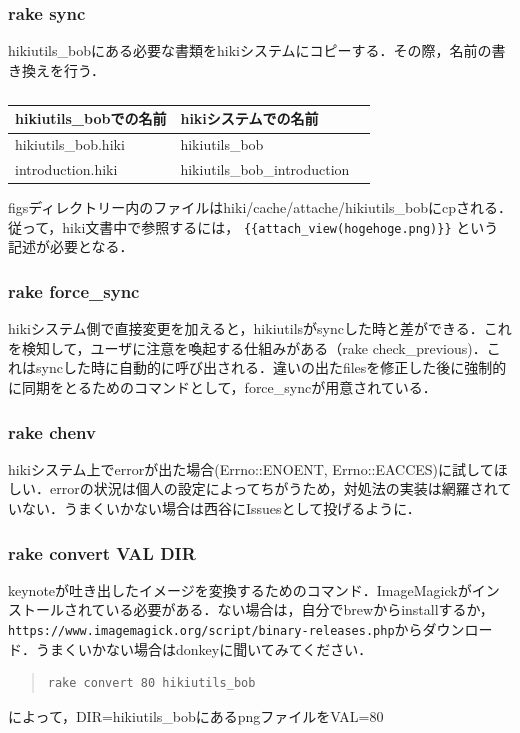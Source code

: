 \subsubsection{rake sync}
hikiutils\_bobにある必要な書類をhikiシステムにコピーする．その際，名前の書き換えを行う．

\begin{table}[htbp]\begin{center}
\caption{}
\begin{tabular}{lll}
\hline
hikiutils\_bobでの名前   &hikiシステムでの名前  \\ \hline
hikiutils\_bob.hiki   &hikiutils\_bob  \\
introduction.hiki   &hikiutils\_bob\_introduction  \\
\hline
\end{tabular}
\label{default}
\end{center}\end{table}

figsディレクトリー内のファイルはhiki/cache/attache/hikiutils\_bobにcpされる．従って，hiki文書中で参照するには，
\verb|{{attach_view(hogehoge.png)}}|
という記述が必要となる．

\subsubsection{rake force\_sync}
hikiシステム側で直接変更を加えると，hikiutilsがsyncした時と差ができる．これを検知して，ユーザに注意を喚起する仕組みがある（rake check\_previous)．これはsyncした時に自動的に呼び出される．違いの出たfilesを修正した後に強制的に同期をとるためのコマンドとして，force\_syncが用意されている．

\subsubsection{rake chenv}
hikiシステム上でerrorが出た場合(Errno::ENOENT, Errno::EACCES)に試してほしい．errorの状況は個人の設定によってちがうため，対処法の実装は網羅されていない．うまくいかない場合は西谷にIssuesとして投げるように．

\subsubsection{rake convert VAL DIR}
keynoteが吐き出したイメージを変換するためのコマンド．ImageMagickがインストールされている必要がある．ない場合は，自分でbrewからinstallするか，\verb|https://www.imagemagick.org/script/binary-releases.php|からダウンロード．うまくいかない場合はdonkeyに聞いてみてください．
\begin{quote}\begin{verbatim}
rake convert 80 hikiutils_bob
\end{verbatim}\end{quote}
によって，DIR=hikiutils\_bobにあるpngファイルをVAL=80%


